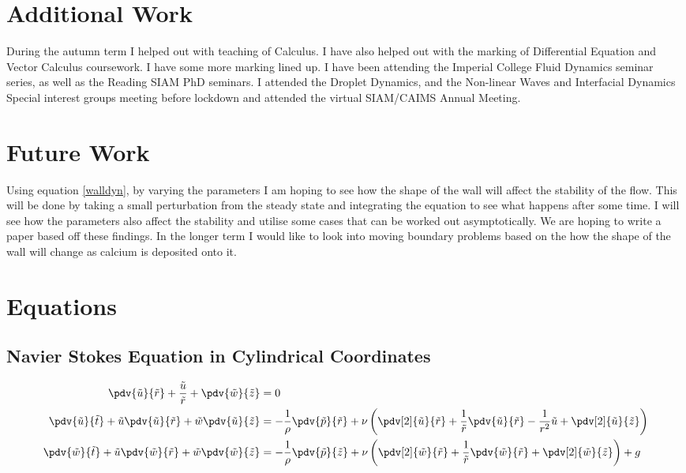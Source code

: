 \documentclass[12pt]{article}
\begin{document}
\section{Additional Work}
During the autumn term I helped out with teaching of Calculus. I have also helped out with the marking of Differential Equation and Vector Calculus coursework. I have some more marking lined up. I have been attending the Imperial College Fluid Dynamics seminar series, as well as the Reading SIAM PhD seminars. I attended the Droplet Dynamics, and the Non-linear Waves and Interfacial Dynamics Special interest groups meeting before lockdown and attended the virtual SIAM/CAIMS Annual Meeting.

\section{Future Work}

Using equation \eqref{walldyn}, by varying the parameters I am hoping to see how the shape of the wall will affect the stability of the flow. This will be done by taking a small perturbation from the steady state and integrating the equation to see what happens after some time. I will see how the parameters also affect the stability and utilise some cases that can be worked out asymptotically. We are hoping to write a paper based off these findings. In the longer term I would like to look into moving boundary problems based on the how the shape of the wall will change as calcium is deposited onto it.
\appendix
\section{Equations}
\subsection{Navier Stokes Equation in Cylindrical Coordinates \label{eqs}}

\begin{align}
\pdv{\tilde u}{\tilde r}+\frac{\tilde u}{\tilde r}+\pdv{\tilde w}{\tilde z}&=0\\
\pdv{\tilde u}{\tilde t}+\tilde u\pdv{\tilde u}{\tilde r}+\tilde w\pdv{\tilde u}{\tilde z}&=-\frac{1}{\rho}\pdv{\tilde p}{\tilde r}+\nu\left(\pdv[2]{\tilde u}{\tilde r}+\frac{1}{\tilde r}\pdv{\tilde u}{\tilde r}-\frac{1}{r^2}\tilde u+\pdv[2]{\tilde u}{\tilde z}\right)\\
\pdv{\tilde w}{\tilde t}+\tilde u\pdv{\tilde w}{\tilde r}+\tilde w\pdv{\tilde w}{\tilde z}&=-\frac{1}{\rho}\pdv{\tilde p}{\tilde z}+\nu\left(\pdv[2]{\tilde w}{\tilde r}+\frac{1}{\tilde r}\pdv{\tilde w}{\tilde r}+\pdv[2]{\tilde w}{\tilde z}\right) + g 
\end{align}
\end{document}
